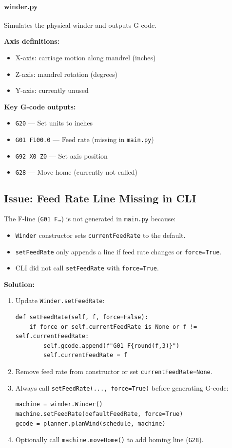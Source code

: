 \documentclass[12pt]{article}
\begin{document}
\paragraph{winder.py} Simulates the physical winder and outputs G-code.  

\textbf{Axis definitions:}

\begin{itemize}
    \item X-axis: carriage motion along mandrel (inches)
    \item Z-axis: mandrel rotation (degrees)
    \item Y-axis: currently unused
\end{itemize}

\textbf{Key G-code outputs:}

\begin{itemize}
    \item \texttt{G20} --- Set units to inches
    \item \texttt{G01 F100.0} --- Feed rate (missing in \texttt{main.py})
    \item \texttt{G92 X0 Z0} --- Set axis position
    \item \texttt{G28} --- Move home (currently not called)
\end{itemize}

\subsection{Issue: Feed Rate Line Missing in CLI}
The F-line (\texttt{G01 F…}) is not generated in \texttt{main.py} because:

\begin{itemize}
    \item \texttt{Winder} constructor sets \texttt{currentFeedRate} to the default.
    \item \texttt{setFeedRate} only appends a line if feed rate changes or \texttt{force=True}.
    \item CLI did not call \texttt{setFeedRate} with \texttt{force=True}.
\end{itemize}

\textbf{Solution:}

\begin{enumerate}
    \item Update \texttt{Winder.setFeedRate}:
\begin{verbatim}
def setFeedRate(self, f, force=False):
    if force or self.currentFeedRate is None or f != self.currentFeedRate:
        self.gcode.append(f"G01 F{round(f,3)}")
        self.currentFeedRate = f
\end{verbatim}
    \item Remove feed rate from constructor or set \texttt{currentFeedRate=None}.
    \item Always call \texttt{setFeedRate(..., force=True)} before generating G-code:
\begin{verbatim}
machine = winder.Winder()
machine.setFeedRate(defaultFeedRate, force=True)
gcode = planner.planWind(schedule, machine)
\end{verbatim}
    \item Optionally call \texttt{machine.moveHome()} to add homing line (\texttt{G28}).
\end{enumerate}
\end{document}
